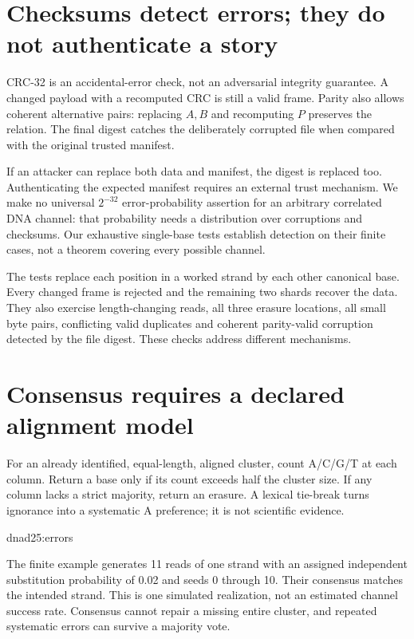 \section{Checksums detect errors; they do not authenticate a story}
CRC-32 is an accidental-error check, not an adversarial integrity guarantee.
A changed payload with a recomputed CRC is still a valid frame. Parity also allows
coherent alternative pairs: replacing $A,B$ and recomputing $P$ preserves
the relation. The final digest catches the deliberately corrupted file
when compared with the original trusted manifest.

If an attacker can replace both data and manifest, the digest is replaced too.
Authenticating the expected manifest requires an external trust mechanism.
We make no universal $2^{-32}$ error-probability assertion for an arbitrary
correlated DNA channel: that probability needs a distribution over corruptions
and checksums. Our exhaustive single-base tests establish detection on their
finite cases, not a theorem covering every possible channel.

The tests replace each position in a worked strand by each other canonical
base. Every changed frame is rejected and the remaining two shards recover
the data. They also exercise length-changing reads, all three erasure locations,
all small byte pairs, conflicting valid duplicates and coherent parity-valid
corruption detected by the file digest. These checks address different mechanisms.

\section{Consensus requires a declared alignment model}
For an already identified, equal-length, aligned cluster, count A/C/G/T at each
column. Return a base only if its count exceeds half the cluster size.
If any column lacks a strict majority, return an erasure. A lexical tie-break
turns ignorance into a systematic A preference; it is not scientific evidence.

{dnad25:errors}

The finite example generates 11 reads of one strand with an assigned independent
substitution probability of 0.02 and seeds 0 through 10. Their consensus matches
the intended strand. This is one simulated realization, not an
estimated channel success rate. Consensus cannot repair a missing entire cluster,
and repeated systematic errors can survive a majority vote.

